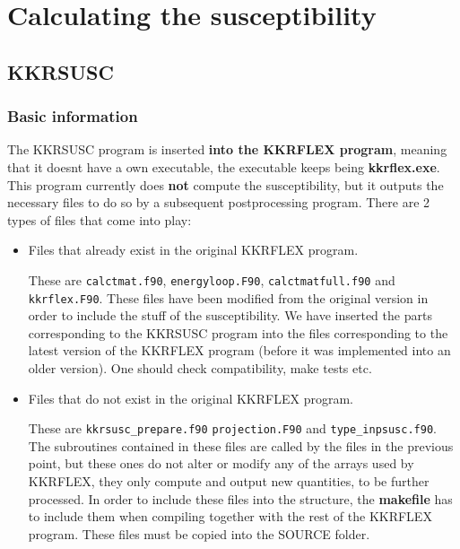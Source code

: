 \documentclass[a4paper,10pt,fullpage]{report}
\begin{document}
\chapter{Calculating the susceptibility}
\label{ch:susc}


\section{KKRSUSC}
\label{sec:kkrsusc}

\subsection{Basic information}
\label{sec:kkrsusc-basic-info}

The KKRSUSC program is inserted \textbf{into the KKRFLEX program},
meaning that it doesnt have a own executable, the executable keeps
being \textbf{kkrflex.exe}. 
This program currently does \textbf{not} compute the susceptibility, but
it outputs the necessary files to do so by a subsequent postprocessing program.
There are 2 types of files that come into play:
\begin{itemize}
\item Files that already exist in the original KKRFLEX  program.

These are  \verb|calctmat.f90|, \verb|energyloop.F90|, \verb|calctmatfull.f90|  
and \verb|kkrflex.F90|. These files have been modified from the original
version in order to include the stuff of the susceptibility. 
We have inserted the parts corresponding to the KKRSUSC program into the files corresponding
to the latest version of the KKRFLEX program (before it was implemented into an older version).
One should check compatibility, make tests etc.

\item Files that do not exist in the original KKRFLEX program. 

These are
\verb|kkrsusc_prepare.f90| \verb|projection.F90| and  \verb|type_inpsusc.f90|.
The subroutines contained in these files are called by the files in the previous
point, but these ones do not alter or modify any of the arrays used by KKRFLEX,
they only compute and output new quantities, to be further processed. 
In order to include these files into the structure, the \textbf{makefile}
has to include them when compiling together with the rest of the KKRFLEX program.
These files must be copied into the SOURCE  folder.




\end{itemize}
\end{document}
